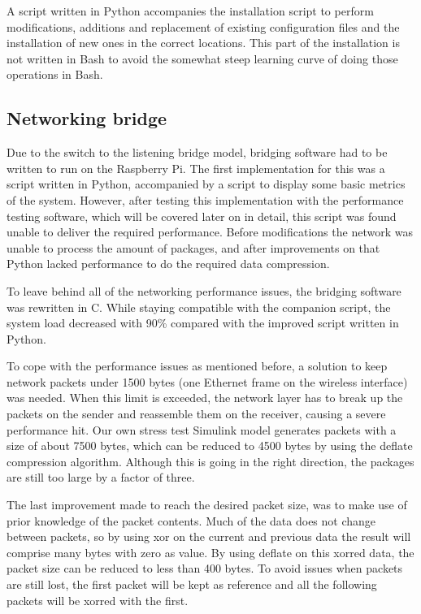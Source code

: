 A script written in Python accompanies the installation script to perform modifications, additions and replacement of existing configuration files and the installation of new ones in the correct locations. This part of the installation is not written in Bash to avoid the somewhat steep learning curve of doing those operations in Bash.

\subsection{Networking bridge}
Due to the switch to the listening bridge model, bridging software had to be written to run on the Raspberry Pi. The first implementation for this was a script written in Python, accompanied by a script to display some basic metrics of the system. However, after testing this implementation with the performance testing software, which will be covered later on in detail, this script was found unable to deliver the required performance. Before modifications the network was unable to process the amount of packages, and after improvements on that Python lacked performance to do the required data compression.

To leave behind all of the networking performance issues, the bridging software was rewritten in C. While staying compatible with the companion script, the system load decreased with 90\% compared with the improved script written in Python.

To cope with the performance issues as mentioned before, a solution to keep network packets under 1500 bytes (one Ethernet frame on the wireless interface) was needed. When this limit is exceeded, the network layer has to break up the packets on the sender and reassemble them on the receiver, causing a severe performance hit. Our own stress test Simulink model generates packets with a size of about 7500 bytes, which can be reduced to 4500 bytes by using the deflate compression algorithm. Although this is going in the right direction, the packages are still too large by a factor of three.

The last improvement made to reach the desired packet size, was to make use of prior knowledge of the packet contents. Much of the data does not change between packets, so by using xor on the current and previous data the result will comprise many bytes with zero as value. By using deflate on this xorred data, the packet size can be reduced to less than 400 bytes. To avoid issues when packets are still lost, the first packet will be kept as reference and all the following packets will be xorred with the first.

